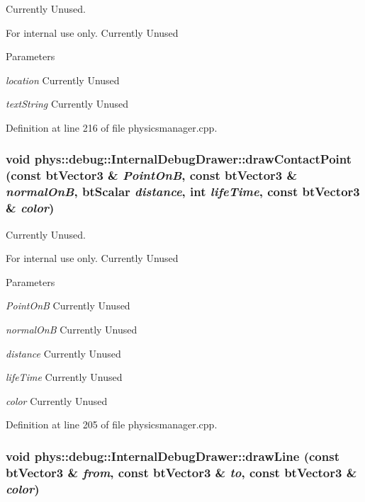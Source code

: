 Currently Unused. 

\begin{DoxyInternal}{For internal use only.}
Currently Unused 
\begin{DoxyParams}{Parameters}
\item[{\em location}]Currently Unused \item[{\em textString}]Currently Unused \end{DoxyParams}
\end{DoxyInternal}


Definition at line 216 of file physicsmanager.cpp.

\hypertarget{classphys_1_1debug_1_1InternalDebugDrawer_a8b912aaff8dfd9f4e97ffb2d867121b2}{
\subsubsection[{drawContactPoint}]{\setlength{\rightskip}{0pt plus 5cm}void phys::debug::InternalDebugDrawer::drawContactPoint (const btVector3 \& {\em PointOnB}, \/  const btVector3 \& {\em normalOnB}, \/  btScalar {\em distance}, \/  int {\em lifeTime}, \/  const btVector3 \& {\em color})}}
\label{db/d27/classphys_1_1debug_1_1InternalDebugDrawer_a8b912aaff8dfd9f4e97ffb2d867121b2}


Currently Unused. 

\begin{DoxyInternal}{For internal use only.}
Currently Unused 
\begin{DoxyParams}{Parameters}
\item[{\em PointOnB}]Currently Unused \item[{\em normalOnB}]Currently Unused \item[{\em distance}]Currently Unused \item[{\em lifeTime}]Currently Unused \item[{\em color}]Currently Unused \end{DoxyParams}
\end{DoxyInternal}


Definition at line 205 of file physicsmanager.cpp.

\hypertarget{classphys_1_1debug_1_1InternalDebugDrawer_a8a35c3c80fddaaec8e21f737ed1b3938}{
\subsubsection[{drawLine}]{\setlength{\rightskip}{0pt plus 5cm}void phys::debug::InternalDebugDrawer::drawLine (const btVector3 \& {\em from}, \/  const btVector3 \& {\em to}, \/  const btVector3 \& {\em color})}}
\label{db/d27/classphys_1_1debug_1_1InternalDebugDrawer_a8a35c3c80fddaaec8e21f737ed1b3938}


